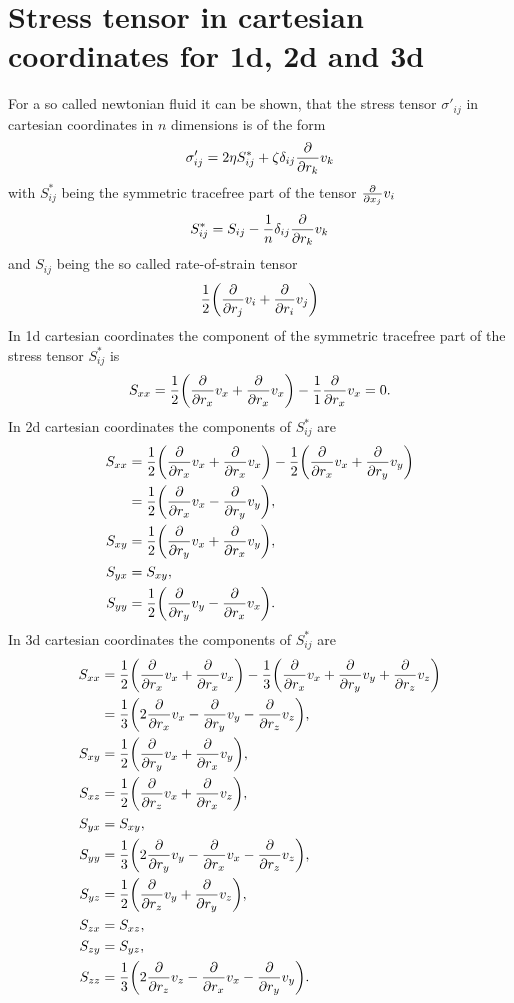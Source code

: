 \section{Stress tensor in cartesian coordinates for 1d, 2d and 3d}
\label{stress1d2d3d}
For a so called newtonian fluid it can be shown, that the stress tensor
$\sigma'_{ij}$ in cartesian coordinates in $n$ dimensions is of the form
\begin{align}
\sigma'_{ij}=2\eta S^*_{ij}+\zeta\delta_{ij}\pd{r_k}v_k 
\end{align}
with $S^*_{ij}$ being the symmetric tracefree part of the tensor $\pd{x_j}v_i$
\begin{align}
S^*_{ij}=S_{ij}-\frac{1}{n}\delta_{ij}\pd{r_k}v_k
\end{align}
and $S_{ij}$ being the so called rate-of-strain tensor
\begin{align}
\frac{1}{2}\lra{\pd{r_j}v_i+\pd{r_i}v_j}
\end{align}
In 1d cartesian coordinates the component of the 
symmetric tracefree part of the stress tensor $S^*_{ij}$ is  
\begin{align}
S_{xx}=\frac{1}{2}\lra{\pd{r_x}v_x+\pd{r_x}v_x}-\frac{1}{1}\pd{r_x}v_x = 0.
\end{align}
In 2d cartesian coordinates the components of $S^*_{ij}$ are
\begin{align}
S_{xx}&=\frac{1}{2}\lra{\pd{r_x}v_x+\pd{r_x}v_x}
		 -\frac{1}{2}\lra{\pd{r_x}v_x+\pd{r_y}v_y}\\
		&=\frac{1}{2}\lra{\pd{r_x}v_x-\pd{r_y}v_y}, \\
S_{xy}&=\frac{1}{2}\lra{\pd{r_y}v_x+\pd{r_x}v_y}, \\
S_{yx}&=S_{xy},\\
S_{yy}&=\frac{1}{2}\lra{\pd{r_y}v_y-\pd{r_x}v_x}.
\end{align}
In 3d cartesian coordinates the components of $S^*_{ij}$ are
\begin{align}
S_{xx}&=\frac{1}{2}\lra{\pd{r_x}v_x+\pd{r_x}v_x}
		 -\frac{1}{3}\lra{\pd{r_x}v_x+\pd{r_y}v_y+\pd{r_z}v_z}\\
		&=\frac{1}{3}\lra{2\pd{r_x}v_x-\pd{r_y}v_y-\pd{r_z}v_z},\\
S_{xy}&=\frac{1}{2}\lra{\pd{r_y}v_x+\pd{r_x}v_y},\\
S_{xz}&=\frac{1}{2}\lra{\pd{r_z}v_x+\pd{r_x}v_z},\\
S_{yx}&=S_{xy},\\
S_{yy}&=\frac{1}{3}\lra{2\pd{r_y}v_y-\pd{r_x}v_x-\pd{r_z}v_z},\\
S_{yz}&=\frac{1}{2}\lra{\pd{r_z}v_y+\pd{r_y}v_z},\\
S_{zx}&=S_{xz},\\
S_{zy}&=S_{yz},\\
S_{zz}&=\frac{1}{3}\lra{2\pd{r_z}v_z-\pd{r_x}v_x-\pd{r_y}v_y}.\\
\end{align}

